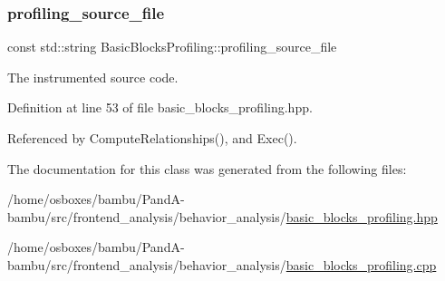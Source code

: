 \subsubsection{\texorpdfstring{profiling\+\_\+source\+\_\+file}{profiling\_source\_file}}
{\footnotesize\ttfamily const std\+::string Basic\+Blocks\+Profiling\+::profiling\+\_\+source\+\_\+file\hspace{0.3cm}{\ttfamily [protected]}}



The instrumented source code. 



Definition at line 53 of file basic\+\_\+blocks\+\_\+profiling.\+hpp.



Referenced by Compute\+Relationships(), and Exec().



The documentation for this class was generated from the following files\+:\begin{DoxyCompactItemize}
\item 
/home/osboxes/bambu/\+Pand\+A-\/bambu/src/frontend\+\_\+analysis/behavior\+\_\+analysis/\hyperlink{basic__blocks__profiling_8hpp}{basic\+\_\+blocks\+\_\+profiling.\+hpp}\item 
/home/osboxes/bambu/\+Pand\+A-\/bambu/src/frontend\+\_\+analysis/behavior\+\_\+analysis/\hyperlink{basic__blocks__profiling_8cpp}{basic\+\_\+blocks\+\_\+profiling.\+cpp}\end{DoxyCompactItemize}

